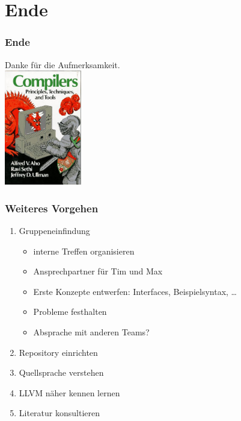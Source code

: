 \documentclass[ucs,9pt]{beamer}
\begin{document}
\section{Ende}
\begin{frame}
  \frametitle{Ende}
  \begin{center}
    \Huge
    Danke für die Aufmerksamkeit.\\[1em]
    \includegraphics[height=5cm]{compilers}
    \ 
  \end{center}
\end{frame}

\begin{frame}
  \frametitle{Weiteres Vorgehen}
  \begin{enumerate}
    \item Gruppeneinfindung
      \begin{itemize}
        \item interne Treffen organisieren
        \item Ansprechpartner für Tim und Max
        \item Erste Konzepte entwerfen: Interfaces, Beispielsyntax, \dots
        \item Probleme festhalten
        \item Absprache mit anderen Teams?
      \end{itemize}
    \item Repository einrichten
    \item Quellsprache verstehen
    \item LLVM näher kennen lernen
    \item Literatur konsultieren
  \end{enumerate}
\end{frame}

\appendix
\section*{\appendixname}
\end{document}
